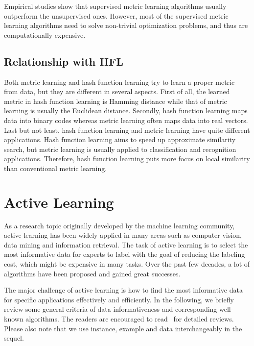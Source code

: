 Empirical studies show that supervised metric learning algorithms usually outperform the unsupervised ones. However, most of the supervised metric learning algorithms need to solve non-trivial optimization problems, and thus are computationally expensive.



\subsection{Relationship with \mbox{HFL}}
Both metric learning and hash function learning try to learn a proper metric from data, but they are different in several aspects. First of all, the learned metric in hash function learning is Hamming distance while that of metric learning is usually the Euclidean distance. Secondly, hash function learning maps data into binary codes whereas metric learning often maps data into real vectors. Last but not least, hash function learning and metric learning have quite different applications. Hash function learning aims to speed up approximate similarity search, but metric learning is usually applied to classification and recognition applications. Therefore, hash function learning puts more focus on local similarity than conventional metric learning.


\section{Active Learning}
\label{background:active}
As a research topic originally developed by the machine learning community, active learning has been widely applied in many areas such as computer vision, data mining and information retrieval. The task of active learning is to select the most informative data for experts to label with the goal of reducing the labeling cost, which might be expensive in many tasks. Over the past few decades, a lot of algorithms have been proposed and gained great successes. 

The major challenge of active learning is how to find the most informative data for specific applications effectively and efficiently. In the following, we briefly review some general criteria of data informativeness and corresponding well-known algorithms. The readers are encouraged to read~\cite{Settles2009survey,tong2001thesis} for detailed reviews. Please also note that we use instance, example and data interchangeably in the sequel.

